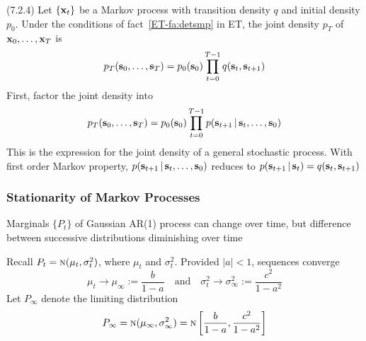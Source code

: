 \begin{frame}

    \vspace{2em}
    \Fact (7.2.4) Let $\{{\mathbf x}_t\}$ be a Markov process with transition density $q$ and
    initial density $p_0$.
    Under the conditions of fact~\ref{ET-fa:detsmp} in ET, the joint density $p_T$ of
    ${\mathbf x}_0, \ldots, {\mathbf x}_T$ is
    \begin{equation}
        \label{eq:jftd}
        p_T({\mathbf s}_0, \ldots, {\mathbf s}_T) 
        = p_0({\mathbf s}_0) \prod_{t=0}^{T-1} q({\mathbf s}_t, {\mathbf s}_{t+1} ) 
    \end{equation}
   \Prf First, factor the joint density into 
    \begin{equation*}
        p_T({\mathbf s}_0, \ldots, {\mathbf s}_T) 
        = p_0({\mathbf s}_0) \prod_{t=0}^{T-1} p({\mathbf s}_{t+1} \, | \, {\mathbf s}_t, \ldots, {\mathbf s}_0) 
    \end{equation*}
    This is the expression for the joint density of a general stochastic process.  With first order Markov property, 
    $p({\mathbf s}_{t+1} \, | \, {\mathbf s}_t, \ldots, {\mathbf s}_0)$ reduces to $p({\mathbf s}_{t+1}
    \, | \, {\mathbf s}_t)=q({\mathbf s}_t, {\mathbf s}_{t+1})$
    
\end{frame}

\begin{frame}\frametitle{Stationarity of Markov Processes}

    \vspace{2em}
    Marginals $\{P_{t}\}$ of Gaussian AR(1) process can change over time, but difference
    between successive distributions diminishing over time
     
    \vspace{1em}
    Recall $P_t = \textrm{\sc n}(\mu_t,
    \sigma^2_t)$, where $\mu_t$ and $\sigma^2_t$. Provided  $|a| < 1$, sequences converge
    \begin{equation*}
        \mu_t \to \mu_{\infty} := \frac{b}{1 - a}
        \quad \text{and} \quad
        \sigma^2_t \to \sigma^2_{\infty} := \frac{c^2}{1 - a^2}
    \end{equation*}
    Let $P_\infty$ denote the limiting distribution
    \begin{equation}
        \label{eq:sdsg}
        P_\infty 
        = \textrm{\sc n}(\mu_\infty, \sigma_\infty^2)
        = \textrm{\sc n} \left[ \frac{b}{1 - a}, \frac{c^2}{1 - a^2} \right]
    \end{equation}
    
\end{frame}


